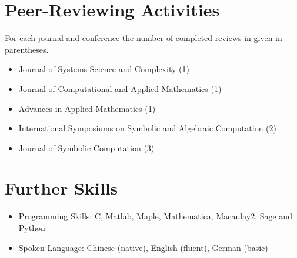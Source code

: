 \documentclass[a4paper,12pt]{article}
\begin{document}
\section*{\Large Peer-Reviewing Activities}
For each journal and conference the number of completed reviews in given in parentheses.
\begin{itemize}
 \item Journal of Systems Science and Complexity (1)
 \item Journal of Computational and Applied Mathematics (1)
 \item Advances in Applied Mathematics (1)
 \item International Symposiums on Symbolic and Algebraic Computation (2)
 \item Journal of Symbolic Computation (3)
\end{itemize}

\section*{\Large{Further Skills}}
\begin{itemize}
 \item Programming Skills: C, Matlab, Maple, Mathematica, Macaulay2, Sage and Python
 \item Spoken Language: Chinese (native), English (fluent), German (basic)
\end{itemize}

% 
\end{document}
